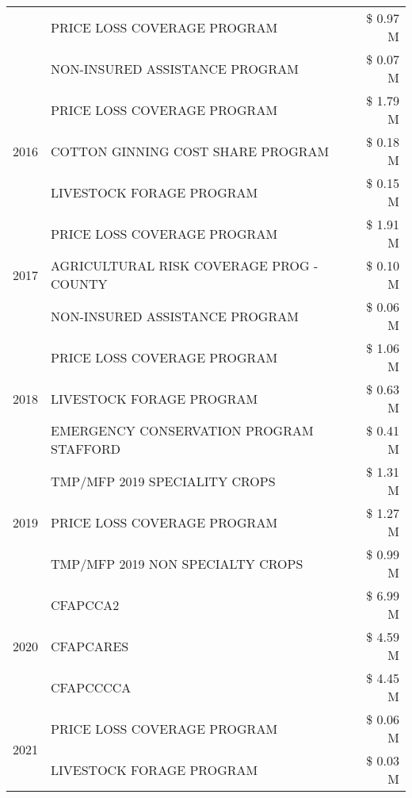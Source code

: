 \begin{tabular}{llr}
 & PRICE LOSS COVERAGE PROGRAM & \$ 0.97 M \\
 & NON-INSURED ASSISTANCE PROGRAM & \$ 0.07 M \\
\cline{1-3}
\multirow[t]{3}{*}{2016} & PRICE LOSS COVERAGE PROGRAM & \$ 1.79 M \\
 & COTTON GINNING COST SHARE PROGRAM & \$ 0.18 M \\
 & LIVESTOCK FORAGE PROGRAM & \$ 0.15 M \\
\cline{1-3}
\multirow[t]{3}{*}{2017} & PRICE LOSS COVERAGE PROGRAM & \$ 1.91 M \\
 & AGRICULTURAL RISK COVERAGE PROG - COUNTY & \$ 0.10 M \\
 & NON-INSURED ASSISTANCE PROGRAM & \$ 0.06 M \\
\cline{1-3}
\multirow[t]{3}{*}{2018} & PRICE LOSS COVERAGE PROGRAM & \$ 1.06 M \\
 & LIVESTOCK FORAGE PROGRAM & \$ 0.63 M \\
 & EMERGENCY CONSERVATION PROGRAM STAFFORD & \$ 0.41 M \\
\cline{1-3}
\multirow[t]{3}{*}{2019} & TMP/MFP 2019 SPECIALITY CROPS & \$ 1.31 M \\
 & PRICE LOSS COVERAGE PROGRAM & \$ 1.27 M \\
 & TMP/MFP 2019 NON SPECIALTY CROPS & \$ 0.99 M \\
\cline{1-3}
\multirow[t]{3}{*}{2020} & CFAPCCA2 & \$ 6.99 M \\
 & CFAPCARES & \$ 4.59 M \\
 & CFAPCCCCA & \$ 4.45 M \\
\cline{1-3}
\multirow[t]{2}{*}{2021} & PRICE LOSS COVERAGE PROGRAM & \$ 0.06 M \\
 & LIVESTOCK FORAGE PROGRAM & \$ 0.03 M \\
\cline{1-3}
\bottomrule
\end{tabular}
